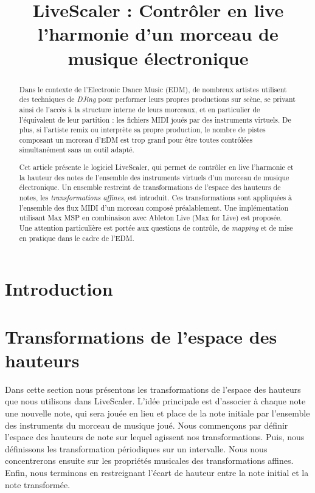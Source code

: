 \documentclass{article}
\title{LiveScaler : Contrôler en live l'harmonie d'un morceau de musique électronique}
\begin{document}
  

\maketitle

\sloppy

\begin{abstract}
Dans le contexte de l'Electronic Dance Music (EDM), de nombreux artistes utilisent des techniques de \emph{DJing} pour performer leurs propres productions sur scène, se privant ainsi de l'accès à la structure interne de leurs morceaux, et en particulier de l'équivalent de leur partition : les fichiers MIDI joués par des instruments virtuels. De plus, si l'artiste remix ou interprète sa propre production, le nombre de pistes composant un morceau d'EDM est trop grand pour être toutes contrôlées simultanément sans un outil adapté.

Cet article présente le logiciel LiveScaler, qui permet de contrôler en live l'harmonie et la hauteur des notes de l'ensemble des instruments virtuels d'un morceau de musique électronique. Un ensemble restreint de transformations de l'espace des hauteurs de notes, les \emph{transformations affines}, est introduit. Ces transformations sont appliquées à l'ensemble des flux MIDI d'un morceau composé préalablement. Une implémentation utilisant Max MSP en combinaison avec Ableton Live (Max for Live) est proposée. Une attention particulière est portée aux questions de contrôle, de \emph{mapping} et de mise en pratique dans le cadre de l'EDM.
\end{abstract}

\section{Introduction}

\section{Transformations de l'espace des hauteurs}
Dans cette section nous présentons les transformations de l'espace des hauteurs que nous utilisons dans LiveScaler. L'idée principale est d'associer à chaque note une nouvelle note, qui sera jouée en lieu et place de la note initiale par l'ensemble des instruments du morceau de musique joué. Nous commençons par définir l'espace des hauteurs de note sur lequel agissent nos transformations. Puis, nous définissons les transformation périodiques sur un intervalle. Nous nous concentrerons ensuite sur les propriétés musicales des transformations affines. Enfin, nous terminons en restreignant l'écart de hauteur entre la note initial et la note transformée.
\end{document}

